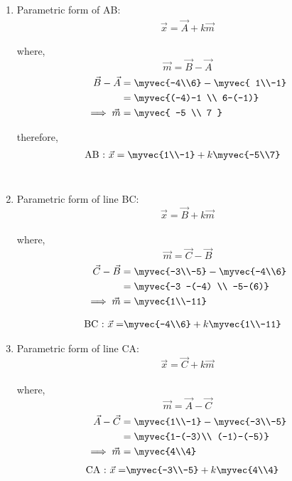 \documentclass[journal,12pt,twocolumn]{IEEEtran}
\begin{document}
\begin{enumerate} 
\item Parametric form of AB: 
\begin{align}
\vec{x} = \vec{A} + k\vec{m}
\end{align}
  
where, $$\vec{m} = \vec{B} - \vec{A}$$
\begin{align}
\vec{B} - \vec{ A }&= \myvec{-4\\6}  -  \myvec{ 1\\-1}\\
&= \myvec{(-4)-1 \\ 6-(-1)}\\
\implies \vec {m} &= \myvec{ -5 \\ 7 }
\end{align}
           
therefore,
\begin{align}
\text{AB : } \vec{x} &= \myvec{1\\-1} + k\myvec{-5\\7}
\end{align}\\

\item Parametric form of line BC:
$$\vec{x} = \vec{B} + k\vec{m}$$\\
where, $$\vec{m}= \vec{C} - \vec{B}$$
\begin{align}
\vec{C}- \vec{B} &= \myvec{-3\\-5} - \myvec{-4\\6}\\
&= \myvec{-3 -(-4) \\ -5-(6)}\\
\implies \vec{m} &= \myvec{1\\-11}
\end{align}

\begin{align}
\text{BC : } \vec{x} =& \myvec{-4\\6} + k\myvec{1\\-11}
\end{align}

\item Parametric form of line CA: 
$$\vec{x} = \vec{C}+ k\vec{m}$$\\
where, $$\vec{m} = \vec{A} - \vec{C}$$
\begin{align} 
\vec{ A } - \vec { C }&= \myvec{1\\-1}- \myvec{-3\\-5}\\
&= \myvec{1-(-3)\\ (-1)-(-5)}\\
\implies \vec {m} &= \myvec{4\\4}
\end{align}
\begin{align}
\text{CA : } \vec{x}=&\myvec{-3\\-5}+k \myvec{4\\4}
\end{align}
\end{enumerate}
\end{document}
